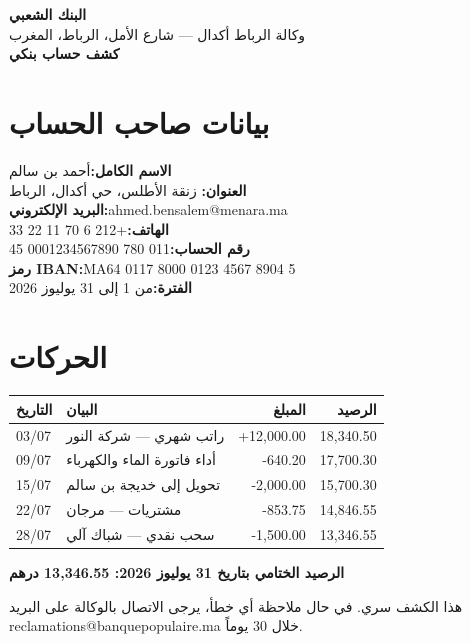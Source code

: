 \documentclass[12pt,a4paper]{article}
\newcommand{\field}[2]{\textbf{#1:}\quad #2\\[0.3em]}
\begin{document}
{\Huge\bfseries\color{accent} البنك الشعبي}\\[0.2em]
{\normalsize وكالة الرباط أكدال — شارع الأمل، الرباط، المغرب}\\[0.8em]
{\LARGE\bfseries كشف حساب بنكي}

\section{بيانات صاحب الحساب}
\field{الاسم الكامل}{أحمد بن سالم}
\field{العنوان}{34 زنقة الأطلس، حي أكدال، الرباط}
\field{البريد الإلكتروني}{\textenglish{ahmed.bensalem@menara.ma}}
\field{الهاتف}{\textenglish{+212 6 70 11 22 33}}
\field{رقم الحساب}{\textenglish{011 780 0001234567890 45}}
\field{رمز \textenglish{IBAN}}{\textenglish{MA64 0117 8000 0123 4567 8904 5}}
\field{الفترة}{من 1 إلى 31 يوليوز 2026}

\section{الحركات}
\begin{tabularx}{\linewidth}{@{}l X r r@{}}
\textbf{التاريخ} & \textbf{البيان} & \textbf{المبلغ} & \textbf{الرصيد} \\
\hline
\textenglish{03/07} & راتب شهري — شركة النور & \textenglish{+12,000.00} & \textenglish{18,340.50} \\
\textenglish{09/07} & أداء فاتورة الماء والكهرباء & \textenglish{-640.20} & \textenglish{17,700.30} \\
\textenglish{15/07} & تحويل إلى خديجة بن سالم & \textenglish{-2,000.00} & \textenglish{15,700.30} \\
\textenglish{22/07} & مشتريات — مرجان & \textenglish{-853.75} & \textenglish{14,846.55} \\
\textenglish{28/07} & سحب نقدي — شباك آلي & \textenglish{-1,500.00} & \textenglish{13,346.55} \\
\end{tabularx}

\vspace{0.8em}
\textbf{الرصيد الختامي بتاريخ 31 يوليوز 2026: \textenglish{13,346.55} درهم}

\vspace{1em}
{\small هذا الكشف سري. في حال ملاحظة أي خطأ، يرجى الاتصال بالوكالة على البريد
\textenglish{reclamations@banquepopulaire.ma} خلال 30 يوماً.}
\end{document}
